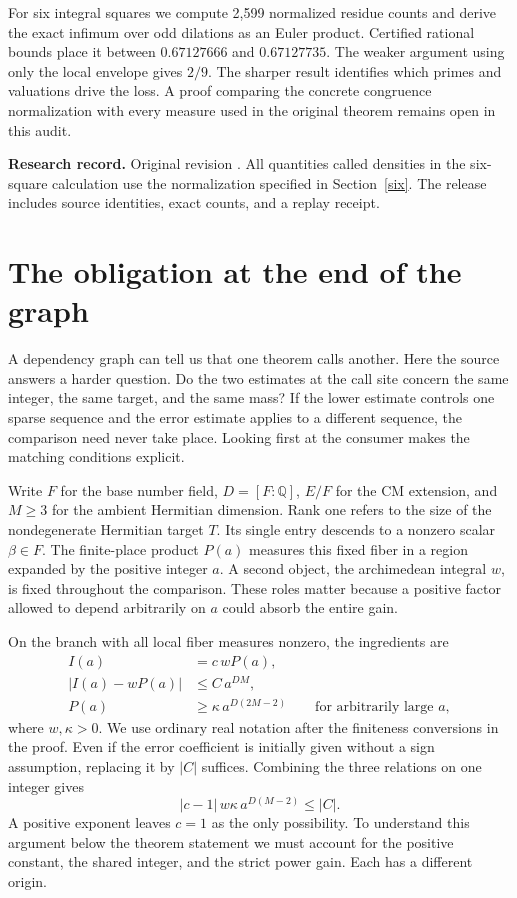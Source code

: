 \documentclass[12pt,letterpaper]{article}
\newcommand{\code}[1]{\texttt{\detokenize{#1}}}
\begin{document}
For six integral squares we compute 2,599 normalized residue counts and derive the exact infimum over odd dilations as an Euler product. Certified rational bounds place it between \(0.67127666\) and \(0.67127735\). The weaker argument using only the local envelope gives \(2/9\). The sharper result identifies which primes and valuations drive the loss. A proof comparing the concrete congruence normalization with every measure used in the original theorem remains open in this audit.

\vfill\textbf{Research record.} Original revision \code{40e56bab}. All quantities called densities in the six-square calculation use the normalization specified in Section~\ref{six}. The release includes source identities, exact counts, and a replay receipt.
\clearpage{\small\setlength{\parskip}{1pt}\tableofcontents}\clearpage{}
\section{The obligation at the end of the graph}
A dependency graph can tell us that one theorem calls another. Here the source answers a harder question. Do the two estimates at the call site concern the same integer, the same target, and the same mass? If the lower estimate controls one sparse sequence and the error estimate applies to a different sequence, the comparison need never take place. Looking first at the consumer makes the matching conditions explicit.

Write \(F\) for the base number field, \(D=[F:\mathbb Q]\), \(E/F\) for the CM extension, and \(M\ge3\) for the ambient Hermitian dimension. Rank one refers to the size of the nondegenerate Hermitian target \(T\). Its single entry descends to a nonzero scalar \(\beta\in F\). The finite-place product \(P(a)\) measures this fixed fiber in a region expanded by the positive integer \(a\). A second object, the archimedean integral \(w\), is fixed throughout the comparison. These roles matter because a positive factor allowed to depend arbitrarily on \(a\) could absorb the entire gain.

On the branch with all local fiber measures nonzero, the ingredients are
\[
 \begin{aligned}
 I(a)&=c\,wP(a),\\
 |I(a)-wP(a)|&\le C\,a^{DM},\\
 P(a)&\ge\kappa\,a^{D(2M-2)}
       \qquad\text{for arbitrarily large }a,
 \end{aligned}
\]
where \(w,\kappa>0\). We use ordinary real notation after the finiteness conversions in the proof. Even if the error coefficient is initially given without a sign assumption, replacing it by \(|C|\) suffices. Combining the three relations on one integer gives
\[
 |c-1|\,w\kappa\,a^{D(M-2)}\le |C|.
\]
A positive exponent leaves \(c=1\) as the only possibility. To understand this argument below the theorem statement we must account for the positive constant, the shared integer, and the strict power gain. Each has a different origin.
\end{document}
